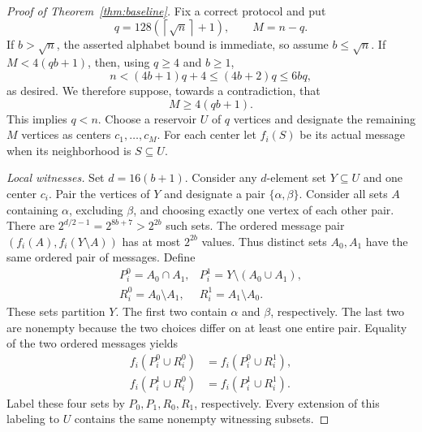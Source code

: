 \documentclass[11pt]{article}
\theoremstyle{remark}
\newcommand{\ceil}[1]{\left\lceil #1\right\rceil}
\begin{document}
\begin{proof}[Proof of Theorem~\ref{thm:baseline}]
Fix a correct protocol and put
\[
 q=128(\ceil{\sqrt n}+1),\qquad M=n-q.
\]
If $b>\sqrt n$, the asserted alphabet bound is immediate, so assume
$b\le\sqrt n$. If $M<4(qb+1)$, then, using $q\ge4$ and $b\ge1$,
\begin{equation}\label{eq:bookkeeping}
 n<(4b+1)q+4\le(4b+2)q\le6bq,
\end{equation}
as desired. We therefore suppose, towards a contradiction, that
\begin{equation}\label{eq:largeM}
 M\ge4(qb+1).
\end{equation}
This implies $q<n$. Choose a reservoir $U$ of $q$ vertices and designate
the remaining $M$ vertices as centers $c_1,\ldots,c_M$. For each center
let $f_i(S)$ be its actual message when its neighborhood is $S\subseteq U$.

\smallskip
\noindent\emph{Local witnesses.}
Set $d=16(b+1)$. Consider any $d$-element set $Y\subseteq U$ and one
center $c_i$. Pair the vertices of $Y$ and designate a pair
$\{\alpha,\beta\}$. Consider all sets $A$ containing $\alpha$, excluding
$\beta$, and choosing exactly one vertex of each other pair. There are
$2^{d/2-1}=2^{8b+7}>2^{2b}$ such sets. The ordered message pair
$(f_i(A),f_i(Y\setminus A))$ has at most $2^{2b}$ values. Thus distinct
sets $A_0,A_1$ have the same ordered pair of messages. Define
\[
\begin{array}{ll}
 P_i^0=A_0\cap A_1,&P_i^1=Y\setminus(A_0\cup A_1),\\
 R_i^0=A_0\setminus A_1,&R_i^1=A_1\setminus A_0.
\end{array}
\]
These sets partition $Y$. The first two contain $\alpha$ and $\beta$,
respectively. The last two are nonempty because the two choices differ on
at least one entire pair. Equality of the two ordered messages yields
\begin{equation}\label{eq:witness}
\begin{split}
 f_i(P_i^0\cup R_i^0)&=f_i(P_i^0\cup R_i^1),\\
 f_i(P_i^1\cup R_i^0)&=f_i(P_i^1\cup R_i^1).
\end{split}
\end{equation}
Label these four sets by $P_0,P_1,R_0,R_1$, respectively. Every extension
of this labeling to $U$ contains the same nonempty witnessing subsets.


\end{proof}
\end{document}
